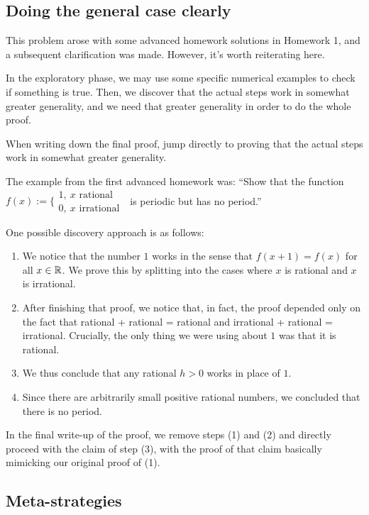 \documentclass{amsart}
\begin{document}
\subsection{Doing the general case clearly}

This problem arose with some advanced homework solutions in Homework
1, and a subsequent clarification was made. However, it's worth
reiterating here.

In the exploratory phase, we may use some specific numerical examples
to check if something is true. Then, we discover that the actual steps
work in somewhat greater generality, and we need that greater
generality in order to do the whole proof.

When writing down the final proof, jump directly to proving that the
actual steps work in somewhat greater generality.

The example from the first advanced homework was: ``Show that the
  function $f(x) := \lbrace \begin{array}{l} 1, \ x \text{ rational }
  \\ 0, \ x \text{ irrational }\end{array}$ is periodic but has no
  period.''

One possible discovery approach is as follows:

\begin{enumerate}
\item We notice that the number $1$ works in the sense that $f (x +
  1) = f(x)$ for all $x \in \mathbb{R}$. We prove this by splitting into the
  cases where $x$ is rational and $x$ is irrational.
\item After finishing that proof, we notice that, in fact, the proof
  depended only on the fact that rational + rational = rational and
  irrational + rational = irrational. Crucially, the only thing we
  were using about $1$ was that it is rational.
\item We thus conclude that any rational $h > 0$ works in place of
  $1$.
\item Since there are arbitrarily small positive rational numbers, we
  concluded that there is no period.
\end{enumerate}

In the final write-up of the proof, we remove steps (1) and (2) and
directly proceed with the claim of step (3), with the proof of that
claim basically mimicking our original proof of (1).

\subsection{Meta-strategies}
\end{document}
